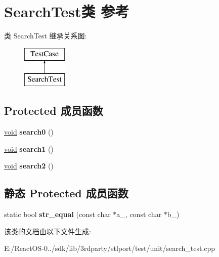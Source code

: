 \hypertarget{class_search_test}{}\section{Search\+Test类 参考}
\label{class_search_test}
类 Search\+Test 继承关系图\+:\begin{figure}[H]
\begin{center}
\leavevmode
\includegraphics[height=2.000000cm]{class_search_test}
\end{center}
\end{figure}
\subsection*{Protected 成员函数}
\begin{DoxyCompactItemize}
\item 
\mbox{\label{class_search_test_a9ead92763e8d34992a0b25021d9bf760}} 
\hyperlink{interfacevoid}{void} {\bfseries search0} ()
\item 
\mbox{\label{class_search_test_aca9cd129cd241316d832d9d9dbf54916}} 
\hyperlink{interfacevoid}{void} {\bfseries search1} ()
\item 
\mbox{\label{class_search_test_ad915335a9d7dae6fa8052f05020c33cc}} 
\hyperlink{interfacevoid}{void} {\bfseries search2} ()
\end{DoxyCompactItemize}
\subsection*{静态 Protected 成员函数}
\begin{DoxyCompactItemize}
\item 
\mbox{\label{class_search_test_a53f25ec82b642ab04f6b5c6e557984c2}} 
static bool {\bfseries str\+\_\+equal} (const char $\ast$a\+\_\+, const char $\ast$b\+\_\+)
\end{DoxyCompactItemize}


该类的文档由以下文件生成\+:\begin{DoxyCompactItemize}
\item 
E\+:/\+React\+O\+S-\/0../sdk/lib/3rdparty/stlport/test/unit/search\+\_\+test.\+cpp\end{DoxyCompactItemize}
